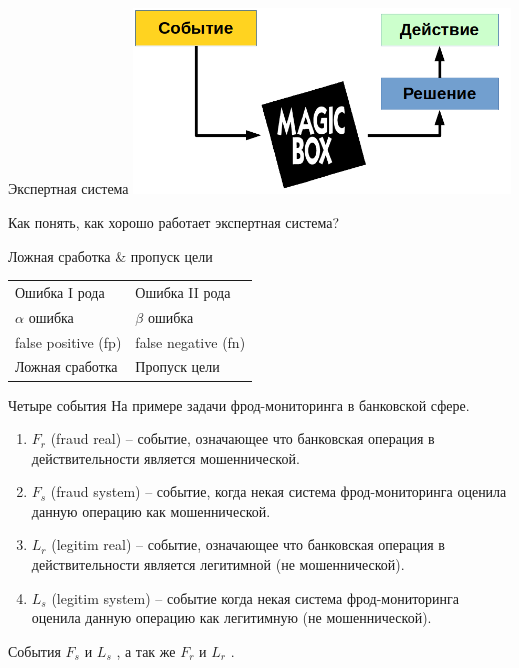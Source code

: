    \begin{frame}{Экспертная система}
       \includegraphics[width=10cm]{../pic/expert_system_1.png}
       
       Как понять, как хорошо работает экспертная система?
   \end{frame}
  
  \begin{frame}{Ложная сработка \& пропуск цели} 
  \centering
  \LARGE
  \begin{tabular}{l|l}
  	Ошибка I рода & Ошибка II рода \\
  	$\alpha$ ошибка & $\beta$ ошибка \\
  	false positive (fp) & false negative (fn) \\ 
  	Ложная сработка  & Пропуск цели \\
  \end{tabular}
  \end{frame}

  \begin{frame}{Четыре события}
  \small На примере задачи фрод-мониторинга в банковской сфере.
  \begin{enumerate}
  	\item $F_r$ (fraud real) -- событие, означающее что банковская операция в действительности является мошеннической. 
  	\item $F_s$ (fraud system) -- событие, когда некая система фрод-мониторинга оценила данную операцию как мошеннической.
  	\item $L_r$ (legitim real) -- событие, означающее что банковская операция в действительности является легитимной (не мошеннической).
  	\item $L_s$ (legitim system) -- событие когда некая система фрод-мониторинга оценила данную операцию как легитимную (не мошеннической).
  \end{enumerate}
  События $F_s$ и $L_s$ , 
  а так же $F_r$ и $L_r$ .
  \end{frame}


